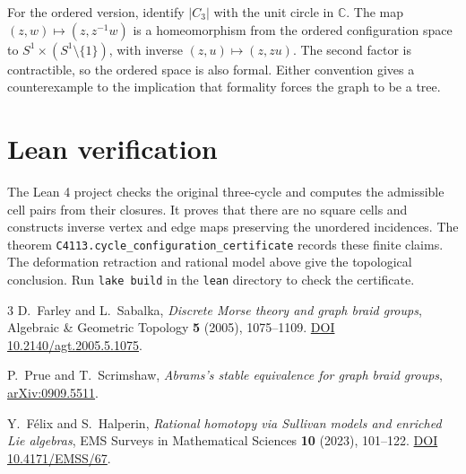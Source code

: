 \documentclass[10pt]{article}
\begin{document}
For the ordered version, identify $|C_3|$ with the unit circle in
$\mathbb C$. The map $(z,w)\mapsto (z,z^{-1}w)$ is a homeomorphism from
the ordered configuration space to $S^1\times(S^1\setminus\{1\})$, with
inverse $(z,u)\mapsto(z,zu)$. The second factor is contractible, so the
ordered space is also formal. Either convention gives a counterexample to
the implication that formality forces the graph to be a tree.

\section*{Lean verification}

The Lean 4 project checks the original three-cycle and computes the
admissible cell pairs from their closures. It proves that there are no
square cells and constructs inverse vertex and edge maps preserving the
unordered incidences. The theorem
\texttt{C4113.cycle\_configuration\_certificate} records these finite
claims. The deformation retraction and rational model above give the
topological conclusion. Run \texttt{lake build} in the \texttt{lean}
directory to check the certificate.

\begin{thebibliography}{3}
D.~Farley and L.~Sabalka, \emph{Discrete Morse theory and graph braid groups},
Algebraic \& Geometric Topology \textbf{5} (2005), 1075--1109.
\href{https://doi.org/10.2140/agt.2005.5.1075}{DOI 10.2140/agt.2005.5.1075}.

P.~Prue and T.~Scrimshaw, \emph{Abrams's stable equivalence for graph braid groups},
\href{https://arxiv.org/abs/0909.5511}{arXiv:0909.5511}.

Y.~F\'elix and S.~Halperin, \emph{Rational homotopy via Sullivan models and enriched Lie algebras},
EMS Surveys in Mathematical Sciences \textbf{10} (2023), 101--122.
\href{https://doi.org/10.4171/EMSS/67}{DOI 10.4171/EMSS/67}.
\end{thebibliography}
\end{document}
